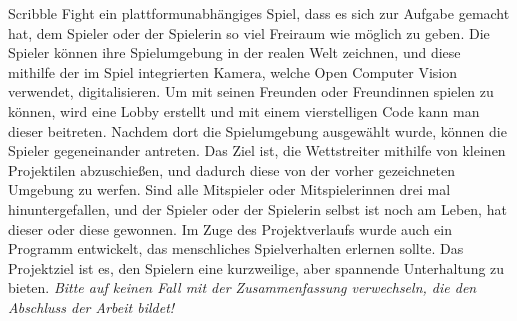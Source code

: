 Scribble Fight ein plattformunabhängiges Spiel, dass es sich zur Aufgabe gemacht hat, dem Spieler oder der Spielerin so viel Freiraum wie möglich zu geben. 
Die Spieler können ihre Spielumgebung in der realen Welt zeichnen, und diese mithilfe der im Spiel integrierten Kamera, welche Open Computer Vision verwendet, digitalisieren.
Um mit seinen Freunden oder Freundinnen spielen zu können, wird eine Lobby erstellt und mit einem vierstelligen Code kann man dieser beitreten.
Nachdem dort die Spielumgebung ausgewählt wurde, können die Spieler gegeneinander antreten. 
Das Ziel ist, die Wettstreiter mithilfe von kleinen Projektilen abzuschießen, und dadurch diese von der vorher gezeichneten Umgebung zu werfen. 
Sind alle Mitspieler oder Mitspielerinnen drei mal hinuntergefallen, und der Spieler oder der Spielerin selbst ist noch am Leben, hat dieser oder diese gewonnen.
Im Zuge des Projektverlaufs wurde auch ein Programm entwickelt, das menschliches Spielverhalten erlernen sollte.
Das Projektziel ist es, den Spielern eine kurzweilige, aber spannende Unterhaltung zu bieten.
\emph{Bitte auf keinen Fall mit der Zusammenfassung verwechseln, die den Abschluss der Arbeit bildet!}
\lipsum[6]
